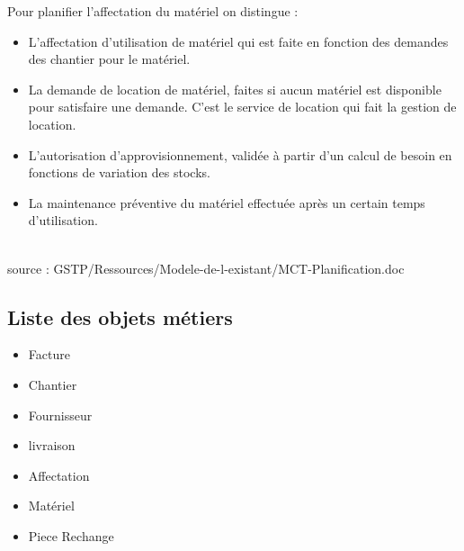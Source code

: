 \documentclass [a4paper] {report}
\begin{document}
	Pour planifier l'affectation du matériel on distingue :\\
	\begin{itemize}
		\item L'affectation d'utilisation de matériel qui est faite en fonction des demandes des chantier pour le matériel.\\
		\item La demande de location de matériel, faites si aucun matériel est disponible pour satisfaire une demande. C'est le service de location qui fait la gestion de location.\\
		\item L'autorisation d'approvisionnement, validée à partir d'un calcul de besoin en fonctions de variation des stocks.\\
		\item La maintenance préventive du matériel effectuée après un certain temps d'utilisation.\\
	\end{itemize}
\hfill\\

source : GSTP/Ressources/Modele-de-l-existant/MCT-Planification.doc


\subsection{Liste des objets métiers}
\begin{itemize}
	\item Facture\\
	\item Chantier\\
	\item Fournisseur\\
	\item livraison\\
	\item Affectation\\
	\item Matériel\\
	\item Piece Rechange\\
\end{itemize}
\end{document}
